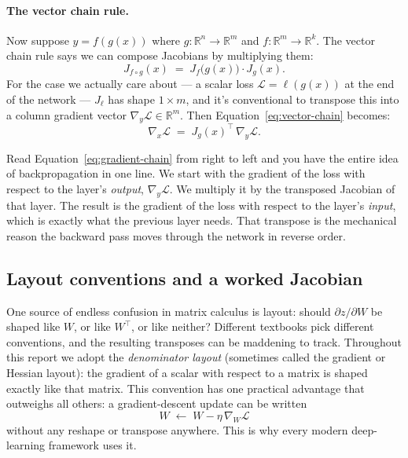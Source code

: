 \documentclass[11pt, a4paper]{article}
\newcommand{\R}{\mathbb{R}}
\newcommand{\T}{^{\!\top}}
\newcommand{\Loss}{\mathcal{L}}
\begin{document}
\paragraph{The vector chain rule.} Now suppose $y = f(g(x))$ where $g: \R^n \to \R^m$ and $f: \R^m \to \R^k$. The vector chain rule says we can compose Jacobians by multiplying them:
\begin{equation}
    J_{f \circ g}(x) \;=\; J_f\bigl(g(x)\bigr) \cdot J_g(x).
    \label{eq:vector-chain}
\end{equation}
For the case we actually care about --- a scalar loss $\Loss = \ell(g(x))$ at the end of the network --- $J_\ell$ has shape $1 \times m$, and it's conventional to transpose this into a column gradient vector $\nabla_y \Loss \in \R^{m}$. Then Equation~\eqref{eq:vector-chain} becomes:
\begin{equation}
    \nabla_x \Loss \;=\; J_g(x)\T \,\nabla_y \Loss.
    \label{eq:gradient-chain}
\end{equation}

\begin{intuitionbox}
Read Equation~\eqref{eq:gradient-chain} from right to left and you have the entire idea of backpropagation in one line. We start with the gradient of the loss with respect to the layer's \emph{output}, $\nabla_y \Loss$. We multiply it by the transposed Jacobian of that layer. The result is the gradient of the loss with respect to the layer's \emph{input}, which is exactly what the previous layer needs. That transpose is the mechanical reason the backward pass moves through the network in reverse order.
\end{intuitionbox}

\subsection{Layout conventions and a worked Jacobian}

One source of endless confusion in matrix calculus is layout: should $\partial z / \partial W$ be shaped like $W$, or like $W\T$, or like neither? Different textbooks pick different conventions, and the resulting transposes can be maddening to track. Throughout this report we adopt the \emph{denominator layout} (sometimes called the gradient or Hessian layout): the gradient of a scalar with respect to a matrix is shaped exactly like that matrix. This convention has one practical advantage that outweighs all others: a gradient-descent update can be written
\[
    W \;\leftarrow\; W - \eta\,\nabla_W \Loss
\]
without any reshape or transpose anywhere. This is why every modern deep-learning framework uses it.
\end{document}
